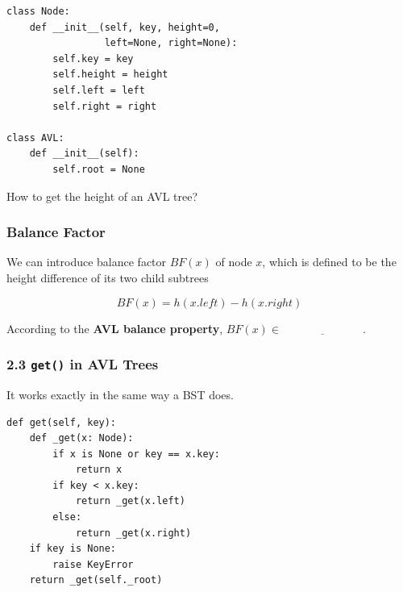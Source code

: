 \documentclass[aspectratio=169, 14pt]{beamer}
\begin{document}
\begin{frame}[fragile]

\begin{verbatim}
class Node:
    def __init__(self, key, height=0, 
                 left=None, right=None):
        self.key = key
        self.height = height
        self.left = left
        self.right = right

class AVL:
    def __init__(self):
        self.root = None
\end{verbatim}
 How to get the height of an AVL tree?
\end{frame}

\begin{frame}
    \frametitle{Balance Factor}
We can introduce \alert{balance factor} $BF(x)$ of node $x$, which is defined to be the height difference of its two child subtrees 

\[BF(x) = h(x.left) - h(x.right)\]

According to the \textbf{AVL balance property}, $BF(x) \in \underline{\hspace{3cm}}$.

\end{frame}

\begin{frame}[fragile]
    \frametitle{2.3 \texttt{get()} in AVL Trees}

It works exactly in the same way a BST does.

    
\end{frame}

\begin{frame}[fragile]

\begin{verbatim}
def get(self, key):
    def _get(x: Node):
        if x is None or key == x.key:
            return x
        if key < x.key:
            return _get(x.left)
        else:
            return _get(x.right)
    if key is None:
        raise KeyError
    return _get(self._root)
\end{verbatim}

\end{frame}
\end{document}
